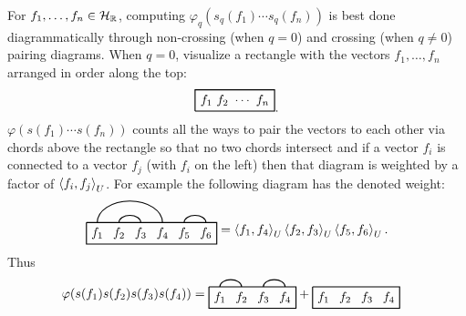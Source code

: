 \begin{rem}
For $f_1,\ldots, f_n\in \mathcal H_{\mathbb{R}}$, computing $\varphi_q(s_q(f_1)\cdots s_q(f_n))$ is best done diagrammatically through non-crossing (when $q=0$) and crossing (when $q\neq 0$) pairing diagrams. When $q=0$, visualize a rectangle with the vectors $f_1,\ldots, f_n$ arranged in order along the top:
	\begin{equation*}
		\begin{tikzpicture}
			\draw [thick] (0,0) -- (0,0.6) -- (2.2,0.6) -- (2.2,0) -- (0,0);
			\node at (1.1,0.3) {$f_1\ f_2\ \cdots\ f_n$};
		\end{tikzpicture}.
	\end{equation*}
$\varphi(s(f_1)\cdots s(f_n))$ counts all the ways to pair the vectors to each other via chords above the rectangle so that no two chords intersect and if a vector $f_i$ is connected to a vector $f_j$ (with $f_i$ on the left) then that diagram is weighted by a factor of $\left\langle f_i,f_j\right\rangle_U$. For example the following diagram has the denoted weight:
	\begin{equation*}
		\begin{tikzpicture}[baseline]
			\draw [thick] (0,0.3) -- (0,-0.3) -- (3.6,-0.3) -- (3.6,0.3) -- (0,0.3);
			\node at (.3,0) {$f_1$};
			\node at (.9,0) {$f_2$};
			\node at (1.5,0) {$f_3$};
			\node at (2.1,0) {$f_4$};
			\node at (2.7,0) {$f_5$};
			\node at (3.3,0) {$f_6$};
			\draw[thick] (2.1,0.3) arc (0:180:0.9 and 0.6); %
			\draw[thick] (1.5,0.3) arc (0:180:0.3 and 0.2);
			\draw[thick] (3.3,0.3) arc (0:180:0.3 and 0.2);
		\end{tikzpicture}
		=\<f_1,f_4\>_U\<f_2,f_3\>_U\<f_5,f_6\>_U.
	\end{equation*}
Thus
	\begin{align*}
		\varphi(s(f_1)s(f_2)s(f_3)s(f_4)) &= 
			\begin{tikzpicture}[baseline]
			\draw [thick] (0,0.3) -- (0,-0.3) -- (2.4,-0.3) -- (2.4,0.3) -- (0,0.3);
			\node at (.3,0) {$f_1$};
			\node at (.9,0) {$f_2$};
			\node at (1.5,0) {$f_3$};
			\node at (2.1,0) {$f_4$};
			\draw[thick] (0.9,0.3) arc (0:180:0.3 and 0.2);
			\draw[thick] (2.1,0.3) arc (0:180:0.3 and 0.2);
			\end{tikzpicture}
		+
			\begin{tikzpicture}[baseline]
			\draw [thick] (0,0.3) -- (0,-0.3) -- (2.4,-0.3) -- (2.4,0.3) -- (0,0.3);
			\node at (.3,0) {$f_1$};
			\node at (.9,0) {$f_2$};
			\node at (1.5,0) {$f_3$};
			\node at (2.1,0) {$f_4$};

\end{tikzpicture}
\end{align*}
\end{rem}
